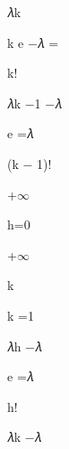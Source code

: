 \documentclass[a4paper,portrait,12pt]{article}
\begin{document}
\begin{flushleft}
𝜆k
\end{flushleft}


\begin{flushleft}
k e $-$𝜆 =
\end{flushleft}


\begin{flushleft}
k!
\end{flushleft}





\begin{flushleft}
𝜆k $-$1 $-$𝜆
\end{flushleft}


\begin{flushleft}
e =𝜆
\end{flushleft}


\begin{flushleft}
(k $-$ 1)!
\end{flushleft}





+$\infty$


\begin{flushleft}
h=0
\end{flushleft}





+$\infty$





\begin{flushleft}
k
\end{flushleft}


\begin{flushleft}
k =1
\end{flushleft}





\begin{flushleft}
𝜆h $-$𝜆
\end{flushleft}


\begin{flushleft}
e =𝜆
\end{flushleft}


\begin{flushleft}
h!
\end{flushleft}





\begin{flushleft}
𝜆k $-$𝜆
\end{flushleft}
\end{document}
